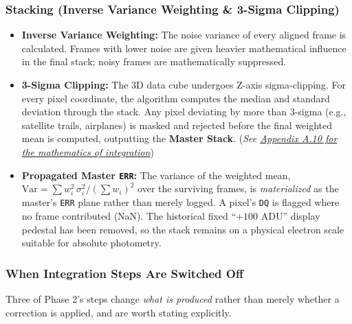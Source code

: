 \documentclass[11pt,a4paper]{article}
\begin{document}
\subsubsection{Stacking (Inverse Variance Weighting \& 3-Sigma Clipping)}
\begin{itemize}[leftmargin=*]
    \item \textbf{Inverse Variance Weighting:} The noise variance of every aligned frame is calculated. Frames with lower noise are given heavier mathematical influence in the final stack; noisy frames are mathematically suppressed.
    \item \textbf{3-Sigma Clipping:} The 3D data cube undergoes Z-axis sigma-clipping. For every pixel coordinate, the algorithm computes the median and standard deviation through the stack. Any pixel deviating by more than 3-sigma (e.g., satellite trails, airplanes) is masked and rejected before the final weighted mean is computed, outputting the \textbf{Master Stack}. (\textit{See \hyperref[app:stacking]{Appendix A.10 for the mathematics of integration}})
    \item \textbf{Propagated Master \texttt{ERR}:} The variance of the weighted mean, $\mathrm{Var} = \sum w_i^2\,\sigma_i^2 / (\sum w_i)^2$ over the surviving frames, is \emph{materialized} as the master's \texttt{ERR} plane rather than merely logged. A pixel's \texttt{DQ} is flagged where no frame contributed (NaN). The historical fixed ``$+100$ ADU'' display pedestal has been removed, so the stack remains on a physical electron scale suitable for absolute photometry.
\end{itemize}

\subsubsection{When Integration Steps Are Switched Off}
Three of Phase 2's steps change \emph{what is produced} rather than merely
whether a correction is applied, and are worth stating explicitly.
\end{document}
